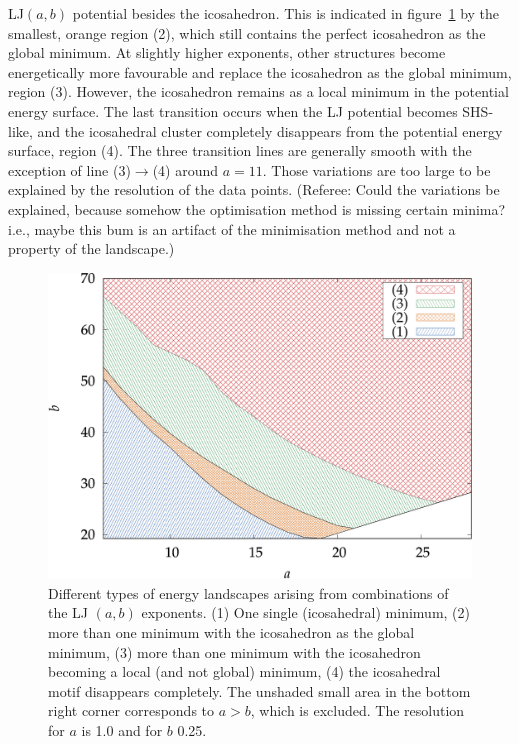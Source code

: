 LJ$(a,b)$ potential besides the icosahedron. This is indicated in
figure~\ref{fig:no-ico} by the smallest, orange region (2), which still
contains the perfect icosahedron as the global minimum. At slightly higher
exponents, other structures become energetically more favourable and replace
the icosahedron as the global minimum, region (3). However, the icosahedron
remains as a local minimum in the potential energy surface. The last transition
occurs when the LJ potential becomes SHS-like, and the icosahedral cluster
completely disappears from the potential energy surface, region (4). The three
transition lines are generally smooth with the exception of line
(3)$\rightarrow$(4) around $a=11$. Those variations are too large to be
explained by the resolution of the data points. {\color{red} (Referee: Could the variations be explained, because somehow the optimisation method is missing certain minima? i.e., maybe this bum is an artifact of the minimisation method and not a property of the landscape.)}

\begin{figure}[htb]\centering
    \includegraphics[width=.8\columnwidth]{gregory-newton/no-ico.pdf}
    \caption{Different types of energy landscapes arising from combinations of
    the LJ $(a,b)$ exponents. (1) One single (icosahedral) minimum, (2) more
    than one minimum with the icosahedron as the global minimum, (3) more than
    one minimum with the icosahedron becoming a local (and not global) minimum,
    (4) the icosahedral motif disappears completely. The unshaded small area
    in the bottom right corner corresponds to $a>b$, which is excluded. The
    resolution for $a$ is 1.0 and for $b$ 0.25.}
    \label{fig:no-ico}
\end{figure}

